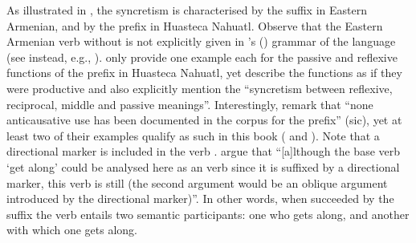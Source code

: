 As illustrated in , the syncretism is characterised by the suffix  in Eastern Armenian, and by the prefix  in Huasteca Nahuatl. Observe that the Eastern Armenian verb  without  is not explicitly given in \citeauthor{dum-tragut:2009}’s (\citeyear{dum-tragut:2009}) grammar of the language (see instead, e.g., \citealt[162]{sakayan:2007}). \citet[81f.]{llanes:al:2017} only provide one example each for the passive and reflexive functions of the prefix  in Huasteca Nahuatl, yet describe the functions as if they were productive and also explicitly mention the “syncretism between reflexive, reciprocal, middle and passive meanings”. Interestingly, \citet[102]{llanes:al:2017} remark that “none anticausative use has been documented in the corpus for the prefix” (sic), yet at least two of their examples qualify as such in this book ( and ). Note that a directional marker  is included in the verb . \citet[91]{llanes:al:2017} argue that “[a]lthough the base verb  ‘get along’ could be analysed here as an  verb since it is suffixed by a directional marker, this verb is still  (the second argument would be an oblique argument introduced by the directional marker)”. In other words, when succeeded by the suffix  the verb  entails two semantic participants: one who gets along, and another with which one gets along.

